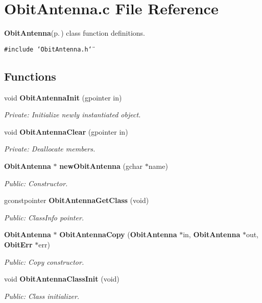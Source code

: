 \section{Obit\-Antenna.c File Reference}
\label{ObitAntenna_8c}
{\bf Obit\-Antenna}{\rm (p.\,\pageref{structObitAntenna})} class function definitions. 

{\tt \#include \char`\"{}Obit\-Antenna.h\char`\"{}}\par
\subsection*{Functions}
\begin{CompactItemize}
\item 
void {\bf Obit\-Antenna\-Init} (gpointer in)
\begin{CompactList}\small\item\em Private: Initialize newly instantiated object. \item\end{CompactList}\item 
void {\bf Obit\-Antenna\-Clear} (gpointer in)
\begin{CompactList}\small\item\em Private: Deallocate members. \item\end{CompactList}\item 
{\bf Obit\-Antenna} $\ast$ {\bf new\-Obit\-Antenna} (gchar $\ast$name)
\begin{CompactList}\small\item\em Public: Constructor. \item\end{CompactList}\item 
gconstpointer {\bf Obit\-Antenna\-Get\-Class} (void)
\begin{CompactList}\small\item\em Public: Class\-Info pointer. \item\end{CompactList}\item 
{\bf Obit\-Antenna} $\ast$ {\bf Obit\-Antenna\-Copy} ({\bf Obit\-Antenna} $\ast$in, {\bf Obit\-Antenna} $\ast$out, {\bf Obit\-Err} $\ast$err)
\begin{CompactList}\small\item\em Public: Copy constructor. \item\end{CompactList}\item 
void {\bf Obit\-Antenna\-Class\-Init} (void)
\begin{CompactList}\small\item\em Public: Class initializer. \item\end{CompactList}\end{CompactItemize}


